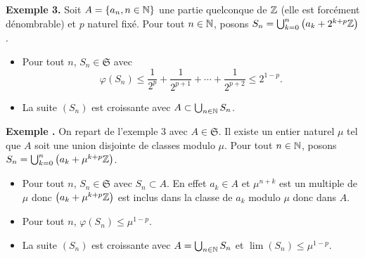 \textbf{Exemple 3.}\newline \label{SuiteCroissAAquelc}
Soit $A = \left\lbrace a_n, n \in\mathbb{N}\right\rbrace$ une partie quelconque de $\mathbb{Z}$ (elle est forcément dénombrable) et $p$ naturel fixé. Pour tout $n \in \mathbb{N}$, posons $S_n = \bigcup_{k =0}^n \left(a_k + 2^{k+p} \mathbb{Z}\right)$.
 \begin{itemize}
  \item Pour tout $n$, $S_n\in \mathfrak{S}$ avec
  \begin{displaymath}
    \varphi(S_n)\leq \frac{1}{2^p} + \frac{1}{2^{p+1}} + \cdots + \frac{1}{2^{p+2}} \leq 2^{1-p}.
  \end{displaymath}
  \item La suite $(S_n)$ est croissante avec $A \subset \bigcup_{n\in \mathbb{N}}S_n$.
 \end{itemize}

 \textbf{Exemple .} \newline \label{SuiteCroissA}
On repart de l'exemple 3 avec $A \in \mathfrak{S}$. Il existe un entier naturel $\mu$ tel que $A$ soit une union disjointe de classes modulo $\mu$. Pour tout $n \in \mathbb{N}$, posons $S_n = \bigcup_{k =0}^n \left(a_k + \mu^{k+p} \mathbb{Z}\right)$.
 \begin{itemize}
  \item Pour tout $n$, $S_n\in \mathfrak{S}$ avec $S_n \subset A$. En effet $a_k \in A$ et $\mu^{n+k}$ est un multiple de $\mu$ donc $\left(a_k + \mu^{k+p} \mathbb{Z}\right)$ est inclus dans la classe de $a_k$ modulo $\mu$ donc dans $A$.
  \item Pour tout $n$, $\varphi(S_n)\leq \mu^{1-p}$.
  \item La suite $(S_n)$ est croissante avec $A = \bigcup_{n\in \mathbb{N}}S_n$ et $\lim (S_n)\leq \mu^{1-p}$.
 \end{itemize}

\newpage
 \printbibliography[heading=bibintoc, title=Bibliographie-Index]
 \printindex



